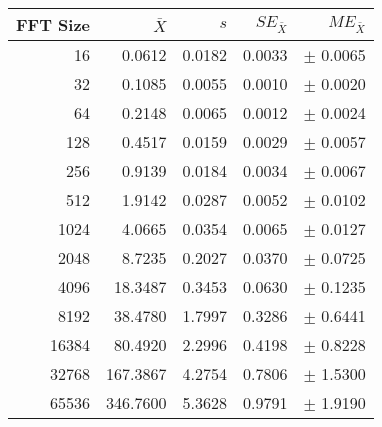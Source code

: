 \begin{tabular}{|r|r|r|r|r|}\hline
    FFT Size & $\bar{X}$ & $s$ & $SE_{\bar{X}}$ & $ME_{\bar{X}}$ \\ \hline
    16 & 0.0612 & 0.0182 & 0.0033 & $\pm$ 0.0065 \\ \hline
    32 & 0.1085 & 0.0055 & 0.0010 & $\pm$ 0.0020 \\ \hline
    64 & 0.2148 & 0.0065 & 0.0012 & $\pm$ 0.0024 \\ \hline
    128 & 0.4517 & 0.0159 & 0.0029 & $\pm$ 0.0057 \\ \hline
    256 & 0.9139 & 0.0184 & 0.0034 & $\pm$ 0.0067 \\ \hline
    512 & 1.9142 & 0.0287 & 0.0052 & $\pm$ 0.0102 \\ \hline
    1024 & 4.0665 & 0.0354 & 0.0065 & $\pm$ 0.0127 \\ \hline
    2048 & 8.7235 & 0.2027 & 0.0370 & $\pm$ 0.0725 \\ \hline
    4096 & 18.3487 & 0.3453 & 0.0630 & $\pm$ 0.1235 \\ \hline
    8192 & 38.4780 & 1.7997 & 0.3286 & $\pm$ 0.6441 \\ \hline
    16384 & 80.4920 & 2.2996 & 0.4198 & $\pm$ 0.8228 \\ \hline
    32768 & 167.3867 & 4.2754 & 0.7806 & $\pm$ 1.5300 \\ \hline
    65536 & 346.7600 & 5.3628 & 0.9791 & $\pm$ 1.9190 \\ \hline
\end{tabular}
